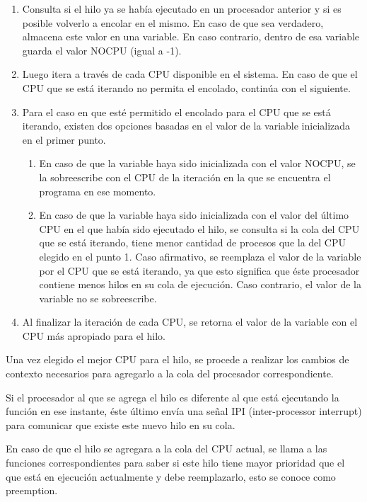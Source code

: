 \begin{enumerate}
    \item Consulta si el hilo ya se había ejecutado en un procesador anterior y si es posible volverlo a encolar en el mismo. En caso de que sea verdadero, almacena este valor en una variable. En caso contrario, dentro de esa variable guarda el valor NOCPU (igual a -1).
    \item Luego itera a través de cada CPU disponible en el sistema. En caso de que el CPU que se está iterando no permita el encolado, continúa con el siguiente.
    \item Para el caso en que esté permitido el encolado para el CPU que se está iterando, existen dos opciones basadas en el valor de la variable inicializada en el primer punto.
          \begin{enumerate}
              \item En caso de que la variable haya sido inicializada con el valor NOCPU, se la sobreescribe con el CPU de la iteración en la que se encuentra el programa en ese momento.
              \item En caso de que la variable haya sido inicializada con el valor del último CPU en el que había sido ejecutado el hilo, se consulta si la cola del CPU que se está iterando, tiene menor cantidad de procesos que la del CPU elegido en el punto 1. Caso afirmativo, se reemplaza el valor de la variable por el CPU que se está iterando, ya que esto significa que éste procesador contiene menos hilos en su cola de ejecución. Caso contrario, el valor de la variable no se sobreescribe.
          \end{enumerate}
    \item Al finalizar la iteración de cada CPU, se retorna el valor de la variable con el CPU más apropiado para el hilo.
\end{enumerate}

Una vez elegido el mejor CPU para el hilo, se procede a realizar los cambios de contexto necesarios para agregarlo a la cola del procesador correspondiente.

Si el procesador al que se agrega el hilo es diferente al que está ejecutando la función en ese instante, éste último envía una señal IPI (inter-processor interrupt) para comunicar que existe este nuevo hilo en su cola.

En caso de que el hilo se agregara a la cola del CPU actual, se llama a las funciones correspondientes para saber si este hilo tiene mayor prioridad que el que está en ejecución actualmente y debe reemplazarlo, esto se conoce como preemption.

